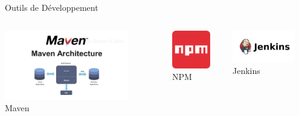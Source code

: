 \documentclass[aspectratio=169]{beamer}
\begin{document}
\begin{frame}{Outils de Développement}
    \vspace{1cm}
    \begin{columns}
        \begin{center}
            \includegraphics[width=0.8\textwidth]{latex_media/media/maven.png}\\
            \small Maven
        \end{center}

        \begin{center}
            \includegraphics[width=0.8\textwidth]{latex_media/media/npm.png}\\
            \small NPM
        \end{center}

        \begin{center}
            \includegraphics[width=0.8\textwidth]{latex_media/media/jenkins.png}\\
            \small Jenkins
        \end{center}


\end{columns}
\end{frame}
\end{document}
